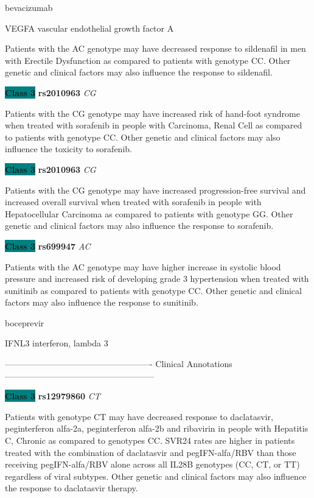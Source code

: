\documentclass{resume} %
\begin{document}
\begin{rSection}{ bevacizumab }
\begin{rSubsection}{ VEGFA }{ vascular endothelial growth factor A }{}{}
\item[] Patients with the AC genotype may have decreased response to sildenafil in men with Erectile Dysfunction as compared to patients with genotype CC. Other genetic and clinical factors may also influence the response to sildenafil.\item \textbf{\colorbox{teal} {Class 3}} \textbf{ rs2010963 } \textit{ CG }
\item[] Patients with the CG genotype may have increased risk of hand-foot syndrome when treated with sorafenib in people with Carcinoma, Renal Cell as compared to patients with genotype CC. Other genetic and clinical factors may also influence the toxicity to sorafenib.\item \textbf{\colorbox{teal} {Class 3}} \textbf{ rs2010963 } \textit{ CG }
\item[] Patients with the CG genotype may have increased progression-free survival and increased overall survival when treated with sorafenib in people with Hepatocellular Carcinoma as compared to patients with genotype GG. Other genetic and clinical factors may also influence the response to sorafenib.\item \textbf{\colorbox{teal} {Class 3}} \textbf{ rs699947 } \textit{ AC }
\item[] Patients with the AC genotype may have higher increase in systolic blood pressure and increased risk of developing grade 3 hypertension when treated with sunitinib as compared to patients with genotype CC. Other genetic and clinical factors may also influence the response to sunitinib.
\end{rSubsection}

\end{rSection}\begin{rSection}{ boceprevir }
\item[]

\begin{rSubsection}{ IFNL3 }{ interferon, lambda 3 }{}{}
\item[]

\item[] ---------------------------------------------------- Clinical Annotations -----------------------------------------------------\newline
\item \textbf{\colorbox{teal} {Class 3}} \textbf{ rs12979860 } \textit{ CT }
\item[] Patients with genotype CT may have decreased response to daclatasvir, peginterferon alfa-2a, peginterferon alfa-2b and ribavirin in people with Hepatitis C, Chronic as compared to genotypes CC. SVR24 rates are higher in patients treated with the combination of daclatasvir and pegIFN-alfa/RBV than those receiving pegIFN-alfa/RBV alone across all IL28B genotypes (CC, CT, or TT) regardless of viral subtypes. Other genetic and clinical factors may also influence the response to daclatasvir therapy.
\end{rSubsection}


\end{rSection}
\end{document}
